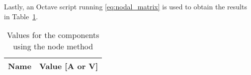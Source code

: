 Lastly, an Octave script running \ref{eq:nodal_matrix} is used to obtain the results in Table~\ref{tab:op3}.


\begin{table}[h]
  \centering
  \begin{tabular}{|l|r|}
    \hline    
    {\bf Name} & {\bf Value [A or V]} \\ \hline
    
  \end{tabular}
  \caption{Values for the components using the node method}
  \label{tab:op3}
\end{table}






